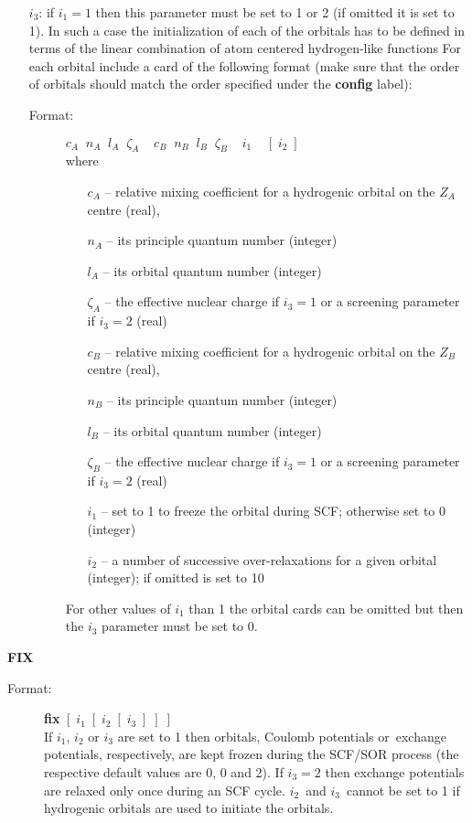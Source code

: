 \documentclass[12pt,a4paper]{article}
\begin{document}
\begin{description}
\begin{description}
\begin{itemize}
\item[$i_3$:] if $i_1=1$ then this parameter must be set to 1 or 2 (if
  omitted it is set to 1). In such a case the initialization of
  each of the orbitals has to be defined in terms of the linear
  combination of atom centered hydrogen-like functions
  For each orbital include a card of the
  following format (make sure that the order of orbitals should match
  the order specified under the \textbf{config} label):
\begin{description} 
\item[Format:] $c_A\;\;n_A \;\;l_A \;\;\zeta_A \;\;\;\;c_B\;\;n_B\;\;l_B\;\;
  \zeta_B\;\;\;\;i_1\;\;\;\;[\;i_2\;]$ \\
where
\begin{itemize}
\item[] $c_A$ -- relative mixing coefficient for a hydrogenic orbital on the
                    $Z_A$ centre (real),
\item[] $n_A$ -- its principle quantum number (integer) 
\item[] $l_A$ -- its orbital quantum number (integer) 
\item[] $\zeta_A$ -- the effective nuclear charge if $i_3=1$ or
a screening parameter if $i_3=2$ (real)
\item[] $c_B$  -- relative mixing coefficient for a hydrogenic orbital on the
                    $Z_B$ centre (real),
\item[] $n_B$ -- its principle quantum number (integer)  
\item[] $l_B$ -- its orbital quantum number (integer) 
\item[] $\zeta_B$ -- the effective nuclear charge if $i_3=1$ or
a screening parameter if $i_3=2$ (real)
\item[] $i_1$ -- set to 1 to freeze the orbital during SCF; otherwise
  set to 0 (integer) 
\item[] $i_2$ -- a number of successive over-relaxations for a given orbital
(integer); if omitted is set to 10
\end{itemize}

For other values of $i_1$ than 1 the orbital cards can be omitted but
then the $i_3$ parameter must be set to 0. 

\end{description}
\end{itemize}  
\end{description} 

\item \textbf{FIX} 
\begin{description} 
\item[Format:] \textbf{fix}  $[\;i_1\;[\;i_2\;[\;i_3\;]\;]\;]$\\
  If $i_1$, $i_2$ or $i_3$ are set to 1 then orbitals, Coulomb
  potentials or~exchange potentials, respectively, are kept frozen during the
  SCF/SOR process (the respective default values are 0, 0 and 2).
  If $i_3=2$ then exchange potentials are relaxed only once during an
  SCF cycle.  $i_2$~and $i_3$~cannot be set to 1 if hydrogenic
    orbitals are used to initiate the orbitals.
\end{description}  



\end{description}
\end{document}
